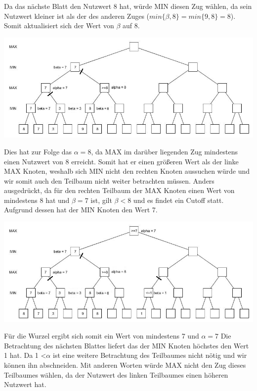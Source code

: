  Da das nächste Blatt den Nutzwert 8 hat, würde MIN diesen Zug wählen, da sein Nutzwert kleiner ist als der des anderen Zuges ($min\{\beta, 8\}= min\{9,8\}=8$). Somit aktualisiert sich der Wert von $\beta$ auf 8.

 \begin{center}
 	\includegraphics[width = 12 cm]{chapters/minimax/jpg/Alpha-beta6.jpg}
 \end{center}

 Dies hat zur Folge das $\alpha =8$, da MAX im darüber liegenden Zug mindestens einen Nutzwert von 8 erreicht. Somit hat er einen größeren Wert als der linke MAX Knoten, weshalb sich MIN nicht den rechten Knoten aussuchen würde und wir somit auch den Teilbaum nicht weiter betrachten müssen. Anders ausgedrückt, da für den rechten Teilbaum der MAX Knoten einen Wert von mindestens 8 hat und  $\beta = 7$ ist, gilt $\beta<8$ und es findet ein Cutoff statt.  Aufgrund dessen hat der MIN Knoten den Wert 7.

 \begin{center}
 	\includegraphics[width = 12 cm]{chapters/minimax/jpg/Alpha-beta7.jpg}
 \end{center}

 Für die Wurzel ergibt sich somit ein Wert von mindestens 7 und $\alpha = 7$
 Die Betrachtung des nächsten Blattes liefert das der MIN Knoten höchstes den Wert 1 hat. Da 1 <$\alpha$ ist eine weitere Betrachtung des Teilbaumes nicht nötig und wir können ihn abschneiden. Mit anderen Worten würde MAX nicht den Zug dieses Teilbaumes wählen, da der Nutzwert des linken Teilbaumes einen höheren Nutzwert hat.

